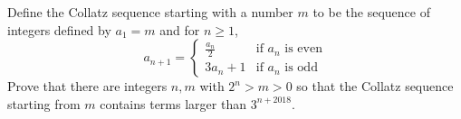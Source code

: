 Define the Collatz sequence starting with a number $m$ to be the sequence of integers defined by $a_1=m$ and for $n\geq1$, \[a_{n+1}=
\begin{cases}
	\frac{a_n}{2} & \text{if $a_n$ is even} \\
	3a_n+1 & \text{if $a_n$ is odd}
\end{cases}
\] Prove that there are integers $n,m$ with $2^n>m>0$ so that the Collatz sequence starting from $m$ contains terms larger than $3^{n+2018}$.